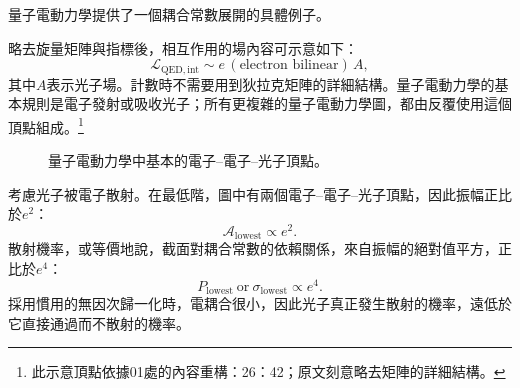 量子電動力學提供了一個耦合常數展開的具體例子。

\begin{classroomqa}
\end{classroomqa}

略去旋量矩陣與指標後，相互作用的場內容可示意如下：
\begin{equation}
\mathcal{L}_{\mathrm{QED,int}}
\sim e\,(\text{electron bilinear})\,A,
\end{equation}
其中\(A\)表示光子場。計數時不需要用到狄拉克矩陣的詳細結構。量子電動力學的基本規則是電子發射或吸收光子；所有更複雜的量子電動力學圖，都由反覆使用這個頂點組成。\footnote{此示意頂點依據01處的內容重構：26：42；原文刻意略去矩陣的詳細結構。}

\begin{figure}[htbp]
\centering
{}
\caption{量子電動力學中基本的電子--電子--光子頂點。}
\end{figure}

\begin{classroomqa}
\end{classroomqa}

\begin{classroomqa}
\end{classroomqa}

考慮光子被電子散射。在最低階，圖中有兩個電子--電子--光子頂點，因此振幅正比於\(e^2\)：
\begin{equation}
\mathcal{A}_{\mathrm{lowest}}\propto e^2.
\end{equation}
散射機率，或等價地說，截面對耦合常數的依賴關係，來自振幅的絕對值平方，正比於\(e^4\)：
\begin{equation}
P_{\mathrm{lowest}}\ \text{or}\ \sigma_{\mathrm{lowest}}
\propto e^4.
\end{equation}
採用慣用的無因次歸一化時，電耦合很小，因此光子真正發生散射的機率，遠低於它直接通過而不散射的機率。

